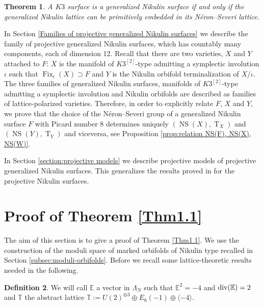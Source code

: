 \documentclass{amsart}
\newtheorem{thm}{Theorem}[section]
\theoremstyle{definition}
\newtheorem{defi}[thm]{Definition}
\numberwithin{equation}{section}
\numberwithin{equation}{section} \theoremstyle{definition}
\DeclareMathOperator{\NS}{NS}
\DeclareMathOperator{\T}{T}
\DeclareMathOperator{\Fix}{Fix}
\begin{document}
\begin{thm}\label{thm: projective $K3$ G polarized are generalized Nikulin}
A $K3$ surface is a generalized Nikulin surface if and only if the generalized Nikulin lattice can be primitively embedded in its N\'eron--Severi lattice.
\end{thm}

In Section \ref{Families of projective generalized Nikulin surfaces} we  describe the family of projective generalized Nikulin surfaces, which has countably many components, each of dimension 12. Recall that there are two varieties, $X$ and $Y$ attached to $F$: $X$ is the  manifold of $K3^{[2]}$-type admitting a symplectic involution $\iota$ such that $\Fix_{\iota}(X)\supset F$ and $Y$ is the Nikulin orbifold terminalization of $X/\iota$. The three families of generalized Nikulin surfaces,  manifolds of $K3^{[2]}$-type admitting a symplectic involution and  Nikulin orbifolds are described as families of lattice-polarized varieties. Therefore, in order to explicitly relate $F$, $X$ and $Y$, we prove that the choice of the N\'eron--Severi group of a generalized Nikulin surface $F$ with Picard number 8 determines uniquely $(\NS(X), \T_X)$ and $(\NS(Y), \T_Y)$ and viceversa, see Proposition \ref{prop:relation NS(F), NS(X), NS(W)}.

In Section \ref{section:projective models} we describe projective models of projective generalized Nikulin surfaces. This generalizes the results proved in \cite{GS} for the projective Nikulin surfaces.


\section{Proof of Theorem \ref{Thm1.1}}\label{section: proofs of 1st theorem}\label{2}

The aim of this section is to give a proof of Theorem \ref{Thm1.1}. We use the construction of the moduli space of marked orbifolds of Nikulin type recalled in Section \ref{subsec:moduli-orbifolds}.
Before we recall some lattice-theoretic results needed in the following.
\begin{defi}
We will call $\mathbb{E}$ a vector in $\Lambda_N$ such that $\mathbb{E}^2=-4$ and $\rm{div}(\mathbb{E})=2$ and $\mathbb{T}$ the abstract lattice $\mathbb{T}:=U(2)^{\oplus 3}\oplus E_8(-1)\oplus\langle -4\rangle$. 
\end{defi}
\end{document}

